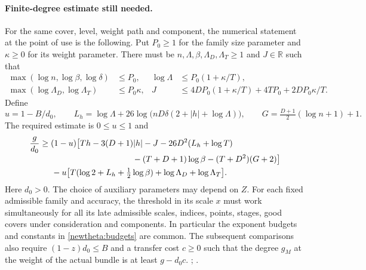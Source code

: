 \paragraph{Finite-degree estimate still needed.}
For the same cover, level, weight path and component, the numerical
statement at the point of use is the following. Put \(P_0\ge1\) for
the family size parameter and \(\kappa\ge0\) for its weight parameter.
There must be \(n,\Lambda,\beta,\Lambda_D,\Lambda_T\ge1\) and \(J\in
\mathbb R\) such that
\begin{align}
 \max(\log n,\log\beta,\log\delta)&\le P_0,&
 \log\Lambda&\le P_0(1+\kappa/T),\nonumber\\
 \max(\log\Lambda_D,\log\Lambda_T)&\le P_0\kappa,&
 J&\le 4DP_0(1+\kappa/T)+4TP_0+2DP_0\kappa/T .
 \label{newtheta:budgets}
\end{align}
Define
\[
 u=1-B/d_0,\qquad
 L_h=\log\Lambda+26\log\!\big(nD\delta(2+|h|+\log\Lambda)\big),
 \qquad G=\tfrac{D+1}{2}(\log n+1)+1 .
\]
The required estimate is \(0\le u\le1\) and
\begin{align}
 \frac{g}{d_0}
 &\ge(1-u)\big[Th-3(D+1)|h|-J-26D^2(L_h+\log T)
          \nonumber\\[-2pt]
 &\hspace{39mm}-(T+D+1)\log\beta-(T+D^2)(G+2)\big]
 \nonumber\\
 &\hspace{5mm}-u\big[T(\log2+L_h+\tfrac12\log\beta)
                    +\log\Lambda_D+\log\Lambda_T\big].
 \label{newtheta:finiteHS}
\end{align}
Here \(d_0>0\). The choice of auxiliary parameters may depend on \(Z\).
For each fixed admissible family and accuracy, the threshold in its
scale \(x\) must work simultaneously for all its late admissible
scales, indices, points, stages, good covers under consideration and
components. In particular the exponent budgets and constants in
\eqref{newtheta:budgets} are common. The subsequent comparisons also
require \((1-z)d_0\le B\) and a transfer cost \(c\ge0\) such that
the degree \(g_M\) at the weight of the actual bundle is at least
\(g-d_0c\).
;
.

